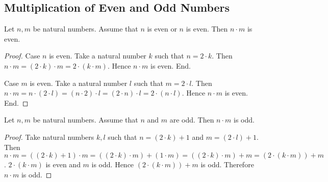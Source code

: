 \documentclass[10pt]{article}
\begin{document}
  \subsection*{Multiplication of Even and Odd Numbers}

  \begin{forthel}
    \begin{proposition}[id=ARITHMETIC_15_0125698547589652,printid]
      Let $n, m$ be natural numbers.
      Assume that $n$ is even or $n$ is even.
      Then $n \cdot m$ is even.
    \end{proposition}
    \begin{proof}
      Case $n$ is even.
        Take a natural number $k$ such that $n = 2 \cdot k$.
        Then $n \cdot m
          = (2 \cdot k) \cdot m
          = 2 \cdot (k \cdot m)$.
        Hence $n \cdot m$ is even.
      End.

      Case $m$ is even.
        Take a natural number $l$ such that $m = 2 \cdot l$.
        Then $n \cdot m
          = n \cdot (2 \cdot l)
          = (n \cdot 2) \cdot l
          = (2 \cdot n) \cdot l
          = 2 \cdot (n \cdot l)$.
        Hence $n \cdot m$ is even.
      End.
    \end{proof}
  \end{forthel}

  \begin{forthel}
    \begin{proposition}[id=ARITHMETIC_15_0236596587452145,printid]
      Let $n, m$ be natural numbers.
      Assume that $n$ and $m$ are odd.
      Then $n \cdot m$ is odd.
    \end{proposition}
    \begin{proof}
      Take natural numbers $k, l$ such that $n = (2 \cdot k) + 1$ and $m = (2 \cdot l) + 1$.
      Then $n \cdot m
        = ((2 \cdot k) + 1) \cdot m
        = ((2 \cdot k) \cdot m) + (1 \cdot m)
        = ((2 \cdot k) \cdot m) + m
        = (2 \cdot (k \cdot m)) + m$.
      $2 \cdot (k \cdot m)$ is even and $m$ is odd.
      Hence $(2 \cdot (k \cdot m)) + m$ is odd.
      Therefore $n \cdot m$ is odd.
    \end{proof}
  \end{forthel}
\end{document}

